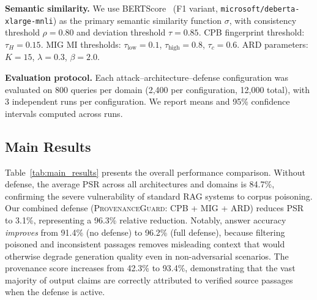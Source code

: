 \documentclass[journal,10pt]{IEEEtran}
\begin{document}
\textbf{Semantic similarity.} We use BERTScore~\cite{zhang2020bertscore} (F1 variant, \texttt{microsoft/deberta-xlarge-mnli}) as the primary semantic similarity function $\sigma$, with consistency threshold $\rho = 0.80$ and deviation threshold $\tau = 0.85$. CPB fingerprint threshold: $\tau_H = 0.15$. MIG MI thresholds: $\tau_{\text{low}} = 0.1$, $\tau_{\text{high}} = 0.8$, $\tau_c = 0.6$. ARD parameters: $K = 15$, $\lambda = 0.3$, $\beta = 2.0$.

\textbf{Evaluation protocol.} Each attack--architecture--defense configuration was evaluated on 800 queries per domain (2{,}400 per configuration, 12{,}000 total), with 3 independent runs per configuration. We report means and 95\% confidence intervals computed across runs.

\subsection{Main Results}

Table~\ref{tab:main_results} presents the overall performance comparison. Without defense, the average PSR across all architectures and domains is 84.7\%, confirming the severe vulnerability of standard RAG systems to corpus poisoning. Our combined defense (\textsc{ProvenanceGuard}: CPB + MIG + ARD) reduces PSR to 3.1\%, representing a 96.3\% relative reduction. Notably, answer accuracy \emph{improves} from 91.4\% (no defense) to 96.2\% (full defense), because filtering poisoned and inconsistent passages removes misleading context that would otherwise degrade generation quality even in non-adversarial scenarios. The provenance score increases from 42.3\% to 93.4\%, demonstrating that the vast majority of output claims are correctly attributed to verified source passages when the defense is active.
\end{document}
